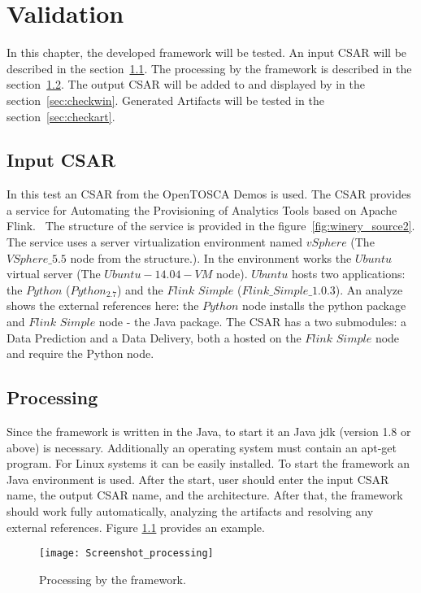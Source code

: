 
\chapter{Validation}\label{chap:check}
In this chapter, the developed framework will be tested.
An input CSAR will be described in the section~\ref{sec:inputcsar}.
The processing by the framework is described in the section~\ref{sec:process}.
The output CSAR will be added to and displayed by  in the section~\ref{sec:checkwin}.
Generated Artifacts will be tested in the section~\ref{sec:checkart}.
\section{Input CSAR}\label{sec:inputcsar}
In this test an CSAR from the OpenTOSCA Demos is used. 
The CSAR provides a service for Automating the Provisioning of Analytics Tools based on Apache Flink.~\cite{csar_test}
The structure of the service is provided in the figure~\ref{fig:winery_source2}. 
The service uses a server virtualization environment named $vSphere$ (The $VSphere\_5.5$ node from the structure.). 
In the environment works the $Ubuntu$ virtual server (The $Ubuntu-14.04-VM$ node).
$Ubuntu$ hosts two applications: the $Python$ ($Python_2.7$) and the $Flink$ $Simple$ ($Flink\_Simple\_1.0.3$).
An analyze shows the external references here: the $Python$ node installs the python package and $Flink$ $Simple$ node - the Java package.
The CSAR has a two submodules: a Data Prediction and a Data Delivery, both a hosted on the $Flink$ $Simple$ node and require the Python node. 

\section{Processing}\label{sec:process}
Since the framework is written in the Java, to start it an Java jdk (version 1.8 or above) is necessary.
Additionally an operating system must contain an apt-get program. 
For Linux systems it can be easily installed.
To start the framework an Java environment is used.
After the start, user should enter the input CSAR name, the output CSAR name, and the architecture.
After that, the framework should work fully automatically, analyzing the artifacts and resolving any external references.
Figure \ref{fig:process} provides an example.
\begin{figure}[ht]   
	\centering
	\texttt{[image: Screenshot\_processing]}
	\caption{Processing by the framework.}
	\label{fig:process}
\end{figure}

